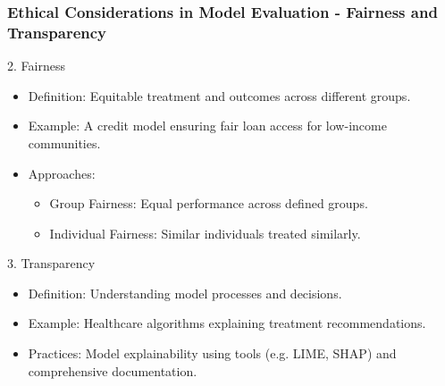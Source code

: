 \documentclass[aspectratio=169]{beamer}
\begin{document}
\begin{frame}[fragile]
    \frametitle{Ethical Considerations in Model Evaluation - Fairness and Transparency}
    \begin{block}{2. Fairness}
        \begin{itemize}
            \item Definition: Equitable treatment and outcomes across different groups.
            \item Example: A credit model ensuring fair loan access for low-income communities.
        \end{itemize}
        
        \begin{itemize}
            \item Approaches:
            \begin{itemize}
                \item Group Fairness: Equal performance across defined groups.
                \item Individual Fairness: Similar individuals treated similarly.
            \end{itemize}
        \end{itemize}
    \end{block}

    \begin{block}{3. Transparency}
        \begin{itemize}
            \item Definition: Understanding model processes and decisions.
            \item Example: Healthcare algorithms explaining treatment recommendations.
            \item Practices: Model explainability using tools (e.g. LIME, SHAP) and comprehensive documentation.
        \end{itemize}
    \end{block}
\end{frame}
\end{document}
